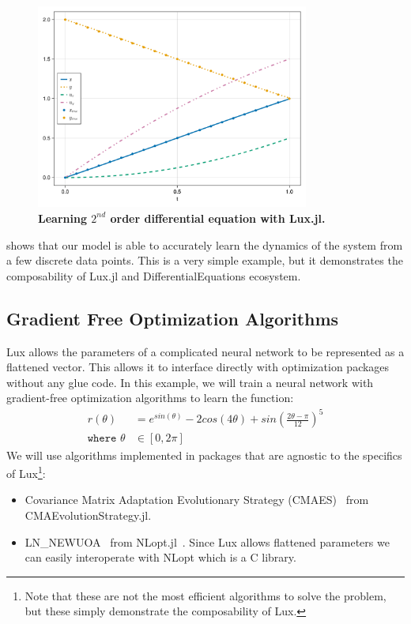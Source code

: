 \inputminted[linenos, breaklines, fontsize=\scriptsize, frame=single, framesep=10pt]{julia}{../code/diffeq.jl}

\begin{figure}[t]
  \centering
  \includegraphics[width=0.8\textwidth]{../figures/lux/diffeq_plot.pdf}
  \caption{\textbf{Learning $2^{nd}$ order differential equation with Lux.jl.}}
  \label{fig:lux_diffeq_plot}
\end{figure}

 shows that our model is able to accurately learn the dynamics of the system from a few discrete data points. This is a very simple example, but it demonstrates the composability of Lux.jl and DifferentialEquations ecosystem.

\subsection{Gradient Free Optimization Algorithms}
\label{subsec:evolutionary_alg_lux}

Lux allows the parameters of a complicated neural network to be represented as a flattened vector. This allows it to interface directly with optimization packages without any glue code. In this example, we will train a neural network with gradient-free optimization algorithms to learn the function:
%
\begin{align}
  r(\theta)              & = e^{sin(\theta)} - 2cos(4\theta) + sin\left(\frac{2\theta - \pi}{12}\right)^5 \\
  \texttt{where } \theta & \in [0, 2\pi]
\end{align}
%
We will use algorithms implemented in packages that are agnostic to the specifics of Lux\footnote{Note that these are not the most efficient algorithms to solve the problem, but these simply demonstrate the composability of Lux.}:
%
\begin{itemize}
  \item Covariance Matrix Adaptation Evolutionary Strategy (CMAES)~\citep{hansen2016cma} from CMAEvolutionStrategy.jl.
  \item LN\_NEWUOA~\citep{powell2006newuoa} from NLopt.jl~\citep{johnson2021nlopt}. Since Lux allows flattened parameters we can easily interoperate with NLopt which is a C library.
\end{itemize}
%

